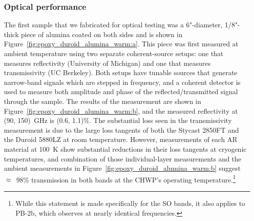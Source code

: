 
\subsubsection{Optical performance}
\label{sec:sapphire_ar_coating_epoxy_plastic_duroid_optical_performance}

The first sample that we fabricated for optical testing was a 6"-diameter, 1/8"-thick piece of alumina coated on both sides and is shown in Figure~\ref{fig:epoxy_duroid_alumina_warm:a}. This piece was first measured at ambient temperature using two separate coherent-source setups: one that measures reflectivity (University of Michigan) and one that measures transmissivity (UC Berkeley). Both setups have tunable sources that generate narrow-band signals which are stepped in frequency, and a coherent detector is used to measure both amplitude and phase of the reflected/transmitted signal through the sample. The results of the measurement are shown in Figure~\ref{fig:epoxy_duroid_alumina_warm:b}, and the measured reflectivity at (90, 150)~GHz is (0.6, 1.1)\%. The substantial loss seen in the transmissivity measurement is due to the large loss tangents of both the Stycast 2850FT and the Duroid 5880LZ at room temperature. However, measurements of each AR material at 100~K show substantial reductions in their loss tangents at cryogenic temperatures, and combination of those individual-layer measurements and the ambient measurements in Figure~\ref{fig:epoxy_duroid_alumina_warm:b} suggest $\approx$~98\% transmission in both bands at the CHWP's operating temperature.\footnote{While this statement is made specifically for the SO bands, it also applies to PB-2b, which observes at nearly identical frequencies.}


